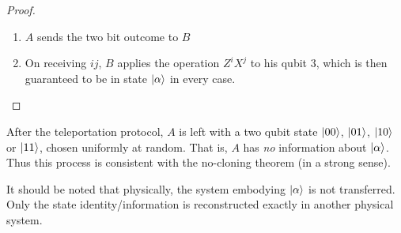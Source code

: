 \documentclass[a4paper]{article}
\begin{document}
\begin{proof}
\begin{enumerate}
		\item $A$ sends the two bit outcome to $B$ 
		\item On receiving $ij$, $B$ applies the operation $Z^i X^j$ to his qubit $3$, which is then guaranteed to be in state $\ket{\alpha}$ in every case.
	\end{enumerate}
\end{proof}

After the teleportation protocol, $A$ is left with a two qubit state $\ket{00}$, $\ket{01}$, $\ket{10}$ or $\ket{11}$, chosen uniformly at random. That is, $A$ has \emph{no} information about $\ket{\alpha}$.
Thus this process is consistent with the no-cloning theorem (in a strong sense).

It should be noted that physically, the system embodying $\ket{\alpha}$ is not transferred. Only the state identity/information is reconstructed exactly in another physical system.
\end{document}
